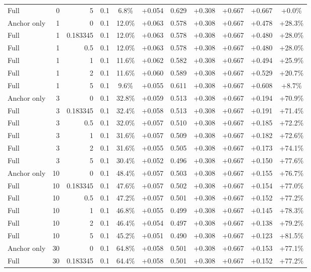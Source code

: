 \begin{table}[htbp]
\begin{tabular}{lrrrccccccc}
Full & 0 & 5 & 0.1 & 6.8\% & +0.054 & 0.629 & +0.308 & +0.667 & +0.667 & +0.0\% \\
Anchor only & 1 & 0 & 0.1 & 12.0\% & +0.063 & 0.578 & +0.308 & +0.667 & +0.478 & +28.3\% \\
Full & 1 & 0.183345 & 0.1 & 12.0\% & +0.063 & 0.578 & +0.308 & +0.667 & +0.480 & +28.0\% \\
Full & 1 & 0.5 & 0.1 & 12.0\% & +0.063 & 0.578 & +0.308 & +0.667 & +0.480 & +28.0\% \\
Full & 1 & 1 & 0.1 & 11.6\% & +0.062 & 0.582 & +0.308 & +0.667 & +0.494 & +25.9\% \\
Full & 1 & 2 & 0.1 & 11.6\% & +0.060 & 0.589 & +0.308 & +0.667 & +0.529 & +20.7\% \\
Full & 1 & 5 & 0.1 & 9.6\% & +0.055 & 0.611 & +0.308 & +0.667 & +0.608 & +8.7\% \\
Anchor only & 3 & 0 & 0.1 & 32.8\% & +0.059 & 0.513 & +0.308 & +0.667 & +0.194 & +70.9\% \\
Full & 3 & 0.183345 & 0.1 & 32.4\% & +0.058 & 0.513 & +0.308 & +0.667 & +0.191 & +71.4\% \\
Full & 3 & 0.5 & 0.1 & 32.0\% & +0.057 & 0.510 & +0.308 & +0.667 & +0.185 & +72.2\% \\
Full & 3 & 1 & 0.1 & 31.6\% & +0.057 & 0.509 & +0.308 & +0.667 & +0.182 & +72.6\% \\
Full & 3 & 2 & 0.1 & 31.6\% & +0.055 & 0.505 & +0.308 & +0.667 & +0.173 & +74.1\% \\
Full & 3 & 5 & 0.1 & 30.4\% & +0.052 & 0.496 & +0.308 & +0.667 & +0.150 & +77.6\% \\
Anchor only & 10 & 0 & 0.1 & 48.4\% & +0.057 & 0.503 & +0.308 & +0.667 & +0.155 & +76.7\% \\
Full & 10 & 0.183345 & 0.1 & 47.6\% & +0.057 & 0.502 & +0.308 & +0.667 & +0.154 & +77.0\% \\
Full & 10 & 0.5 & 0.1 & 47.2\% & +0.057 & 0.501 & +0.308 & +0.667 & +0.152 & +77.2\% \\
Full & 10 & 1 & 0.1 & 46.8\% & +0.055 & 0.499 & +0.308 & +0.667 & +0.145 & +78.3\% \\
Full & 10 & 2 & 0.1 & 46.4\% & +0.054 & 0.497 & +0.308 & +0.667 & +0.138 & +79.2\% \\
Full & 10 & 5 & 0.1 & 45.2\% & +0.051 & 0.490 & +0.308 & +0.667 & +0.123 & +81.5\% \\
Anchor only & 30 & 0 & 0.1 & 64.8\% & +0.058 & 0.501 & +0.308 & +0.667 & +0.153 & +77.1\% \\
Full & 30 & 0.183345 & 0.1 & 64.4\% & +0.058 & 0.501 & +0.308 & +0.667 & +0.152 & +77.2\% \\

\end{tabular}
\end{table}
